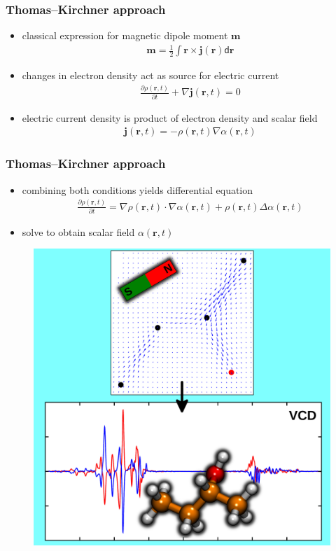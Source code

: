 \documentclass[t]{beamer}
\begin{document}
\begin{frame}
	\frametitle{Thomas--Kirchner approach}
	\begin{itemize}
		\item classical expression for magnetic dipole moment $\mathbf{m}$
		      \begin{align*}
			      \mathbf{m} = \frac{1}{2} \int \mathbf{r} \times \mathbf{j}(\mathbf{r}) \mathsf{d}\mathbf{r}
		      \end{align*}
		      \pause
		\item changes in electron density act as source for electric current
		      \begin{align*}
			      \frac{\partial \rho (\mathbf{r},t)}{\partial t} + \nabla \mathbf{j}(\mathbf{r},t) = 0
		      \end{align*}
		      \pause
		\item electric current density is product of electron density and scalar field
		      \begin{align*}
			      \mathbf{j}(\mathbf{r},t) = -\rho (\mathbf{r},t) \nabla \alpha(\mathbf{r},t)
		      \end{align*}
	\end{itemize}
\end{frame}
\begin{frame}
	\frametitle{Thomas--Kirchner approach}
	\begin{itemize}
		\item combining both conditions yields differential equation
		      \begin{align*}
			      \frac{\partial \rho (\mathbf{r},t)}{\partial t} = \nabla \rho (\mathbf{r},t) \cdot \nabla \alpha (\mathbf{r},t) + \rho(\mathbf{r},t) \Delta \alpha(\mathbf{r},t)
		      \end{align*}
		\item solve to obtain scalar field $\alpha(\mathbf{r},t)$
	\end{itemize}
	\begin{figure}
		\includegraphics[width=.38\textwidth]{figures/MT_TOC.png}
	\end{figure}
\end{frame}
\end{document}
